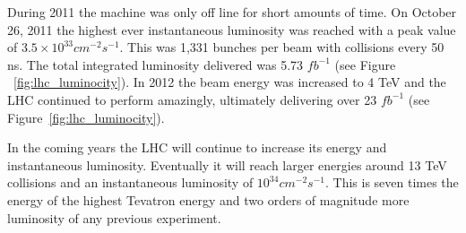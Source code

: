 During 2011 the machine was only off line for short amounts of time.  On October 26, 2011 the highest ever instantaneous luminosity was reached with a peak value of $3.5 \times 10^{33} cm^{-2} s^{-1}$.  This was 1,331 bunches per beam with collisions every 50 ns. The total integrated luminosity delivered was 5.73 $fb^{-1}$ (see Figure ~\ref{fig:lhc_luminocity}). In 2012 the beam energy was increased to 4 TeV and the LHC continued to perform amazingly, ultimately delivering over 23 $fb^{-1}$ (see Figure~\ref{fig:lhc_luminocity}).

In the coming years the LHC will continue to increase its energy and instantaneous luminosity.  Eventually it will reach larger energies around 13 TeV collisions and an instantaneous luminosity of $10^{34} cm^{-2}s^{-1}$.  This is seven times the energy of the highest Tevatron energy and two orders of magnitude more luminosity of any previous experiment.



